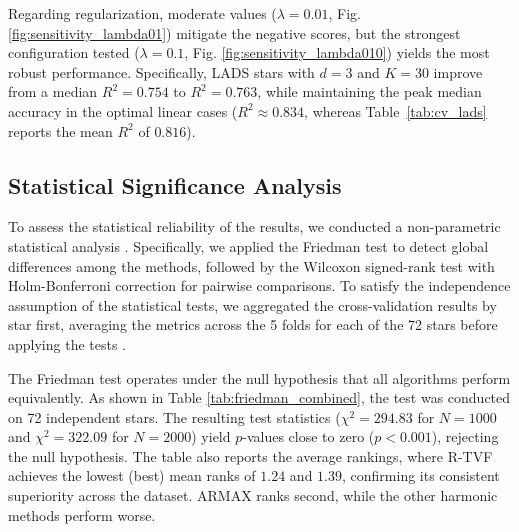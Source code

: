 \documentclass[a4paper,fleqn]{cas-sc}
\begin{document}
Regarding regularization, moderate values ($\lambda=0.01$, Fig. \ref{fig:sensitivity_lambda01}) mitigate the negative scores, but the strongest configuration tested ($\lambda=0.1$, Fig. \ref{fig:sensitivity_lambda010}) yields the most robust performance. Specifically, LADS stars with $d=3$ and $K=30$ improve from a median $R^2=0.754$ to $R^2=0.763$, while maintaining the peak median accuracy in the optimal linear cases ($R^2 \approx 0.834$, whereas Table~\ref{tab:cv_lads} reports the mean $R^2$ of $0.816$).



\subsection{Statistical Significance Analysis}

To assess the statistical reliability of the results, we conducted a non-parametric statistical analysis \cite{demvsar2006statistical}. Specifically, we applied the Friedman test to detect global differences among the methods, followed by the Wilcoxon signed-rank test with Holm-Bonferroni correction for pairwise comparisons. To satisfy the independence assumption of the statistical tests, we aggregated the cross-validation results by star first, averaging the metrics across the 5 folds for each of the 72 stars before applying the tests \cite{demvsar2006statistical}.

The Friedman test operates under the null hypothesis that all algorithms perform equivalently. As shown in Table \ref{tab:friedman_combined}, the test was conducted on 72 independent stars. The resulting test statistics ($\chi^2 = 294.83$ for $N=1000$ and $\chi^2 = 322.09$ for $N=2000$) yield $p$-values close to zero ($p < 0.001$), rejecting the null hypothesis. The table also reports the average rankings, where R-TVF achieves the lowest (best) mean ranks of $1.24$ and $1.39$, confirming its consistent superiority across the dataset. ARMAX ranks second, while the other harmonic methods perform worse.
\end{document}
